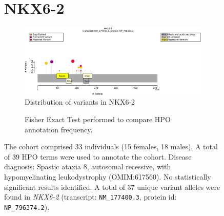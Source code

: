 \begin{figure}[htbp]
\section*{NKX6-2}
\centering
\begin{subfigure}[b]{0.95\textwidth}
\centering
\includegraphics[width=\textwidth]{ img/NKX6-2_protein_diagram.pdf} 
\captionsetup{justification=raggedright,singlelinecheck=false}
\caption{Distribution of variants in NKX6-2}
\end{subfigure}

\vspace{2em}

\begin{subfigure}[b]{0.95\textwidth}
\centering
{}
\captionsetup{justification=raggedright,singlelinecheck=false}
\caption{Fisher Exact Test performed to compare HPO annotation frequency. }
\end{subfigure}

\vspace{2em}

\caption{The cohort comprised 33 individuals (15 females, 18 males). A total of 39 HPO terms were used to annotate the cohort. Disease diagnosis: Spastic ataxia 8, autosomal recessive, with hypomyelinating leukodystrophy (OMIM:617560). No statistically significant results identified. A total of 37 unique variant alleles were found in \textit{NKX6-2} (transcript: \texttt{NM\_177400.3}, protein id: \texttt{NP\_796374.2}).}
\end{figure}
